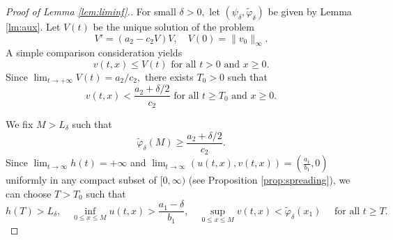 \documentclass[reqno]{amsart}
\newcommand{\rev}[1]{#1}
\theoremstyle{plain}
\theoremstyle{definition}
\theoremstyle{remark}
\begin{document}
	\begin{proof}[Proof of Lemma \ref{lem:liminf}.]
		For small \(\delta > 0,\) let \((\psi_\delta, \tilde{\varphi}_\delta)\) be given by Lemma \ref{lm:aux}. Let \(V(t)\) be the unique solution of the problem 
		\[
		V' = (a_2 - c_2V)V, \quad V(0) = \|v_0\|_\infty.
		\]
		A simple comparison consideration yields 
		\[
		v(t,x) \le V(t)  \text{ for all } t > 0\text{ and } x \ge 0.
		\]
		Since \(\lim_{t \to +\infty}V(t) = a_2/c_2,\) there exists \(T_0 > 0\) such that
		\[
		v(t,x) < \frac{a_2 + \delta/2}{c_2} \text{ for all } t \ge T_0\text{ and } x \ge 0. 
		\]
		
		We fix $M>L_\delta$ such that
		\[
		\tilde{\varphi}_\delta(M)\ge\frac{a_2+\delta/2}{c_2}.
		\]
		Since $\lim_{t\to\infty} h(t) = +\infty$ and $\lim_{t\to\infty} (u(t,x), v(t,x)) = \left(\frac{a_1}{b_1},0\right)$
		uniformly in any compact subset of $[0, \infty)$ (see \rev{Proposition \ref{prop:spreading}}), we can choose $T>T_0$ such that
		\[
		h(T)>L_\delta,
		\quad \inf_{0\le x\le M}u(t,x) > \frac{a_1- \delta}{b_1},
		\quad \sup_{0\le x\le M}v(t,x)<\tilde{\varphi}_\delta(x_1) \quad\text{ for all } t\ge T.
		\]
		

\end{proof}
\end{document}
